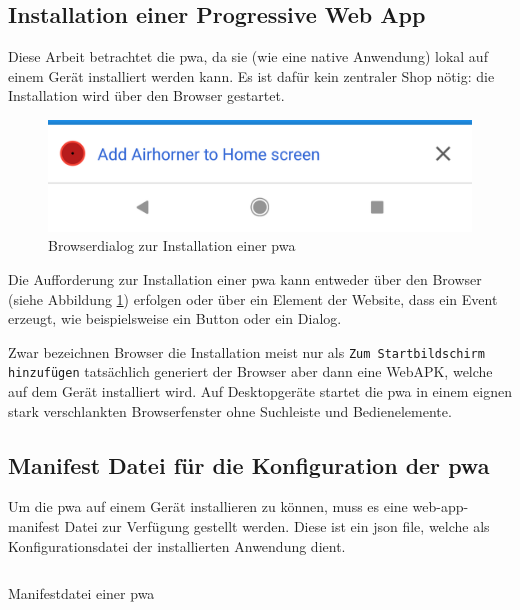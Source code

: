 \subsection{Installation einer Progressive Web App}

Diese Arbeit betrachtet die \ac{pwa}, da sie (wie eine native Anwendung) lokal auf einem Gerät installiert werden kann. Es ist dafür kein zentraler Shop nötig: die Installation wird über den Browser gestartet.

\begin{figure}[h]
        \centering
        \includegraphics[scale=0.2]{img/a2hs-infobar-cropped.png}
        \caption{Browserdialog zur Installation einer \ac{pwa} \cite{PWAAddToHomeScreenPrompt}}
        \label{fig:pwainstallationprompt}
\end{figure}

Die Aufforderung zur Installation einer \ac{pwa} kann entweder über den Browser (siehe Abbildung \ref{fig:pwainstallationprompt}) erfolgen oder über ein Element der Website, dass ein Event erzeugt, wie beispielsweise ein Button oder ein Dialog. 

Zwar bezeichnen Browser die Installation meist nur als \texttt{Zum Startbildschirm hinzufügen} tatsächlich generiert der Browser aber dann eine WebAPK, welche auf dem Gerät installiert wird. Auf Desktopgeräte startet die \ac{pwa} in einem eignen stark verschlankten Browserfenster ohne Suchleiste und Bedienelemente. \cite{GooglePWAInstallation}


\subsection{Manifest Datei für die Konfiguration der \ac{pwa}}

Um die \ac{pwa} auf einem Gerät installieren zu können, muss es eine web-app-manifest Datei zur Verfügung gestellt werden. Diese ist ein \ac{json} file, welche als Konfigurationsdatei der installierten Anwendung dient. \cite{GooglePWAManifest}

\begin{listing}[H]
    \inputminted{json}{sourcecode/manifest_sample.json}
    \caption{Manifestdatei einer \ac{pwa}}
      \label{sourcecode:manifest_sample}
\end{listing}


